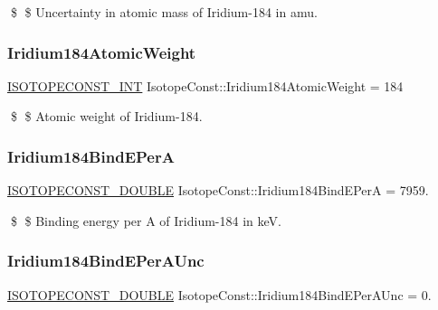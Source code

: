 \$ \$ Uncertainty in atomic mass of Iridium-\/184 in amu. \mbox{\label{group___isotope_const-_iridium-_ir184_gada0e016168f85ea24ee23e9ec53e5b4f}} 
\subsubsection{\texorpdfstring{Iridium184\+Atomic\+Weight}{Iridium184AtomicWeight}}
{\footnotesize\ttfamily \mbox{\hyperlink{group___isotope_const-_macros_ga5f18360b3e99483a35c32d789e62621c}{I\+S\+O\+T\+O\+P\+E\+C\+O\+N\+S\+T\+\_\+\+I\+NT}} Isotope\+Const\+::\+Iridium184\+Atomic\+Weight = 184}

\$ \$ Atomic weight of Iridium-\/184. \mbox{\label{group___isotope_const-_iridium-_ir184_ga90e23a158781120194e399ee49cd452d}} 
\subsubsection{\texorpdfstring{Iridium184\+Bind\+E\+PerA}{Iridium184BindEPerA}}
{\footnotesize\ttfamily \mbox{\hyperlink{group___isotope_const-_macros_ga8f45a7272ce02c0b4c65c44636ed719a}{I\+S\+O\+T\+O\+P\+E\+C\+O\+N\+S\+T\+\_\+\+D\+O\+U\+B\+LE}} Isotope\+Const\+::\+Iridium184\+Bind\+E\+PerA = 7959.}

\$ \$ Binding energy per A of Iridium-\/184 in keV. \mbox{\label{group___isotope_const-_iridium-_ir184_ga449b40552960fb5dd070e16cfe91ba2e}} 
\subsubsection{\texorpdfstring{Iridium184\+Bind\+E\+Per\+A\+Unc}{Iridium184BindEPerAUnc}}
{\footnotesize\ttfamily \mbox{\hyperlink{group___isotope_const-_macros_ga8f45a7272ce02c0b4c65c44636ed719a}{I\+S\+O\+T\+O\+P\+E\+C\+O\+N\+S\+T\+\_\+\+D\+O\+U\+B\+LE}} Isotope\+Const\+::\+Iridium184\+Bind\+E\+Per\+A\+Unc = 0.}

